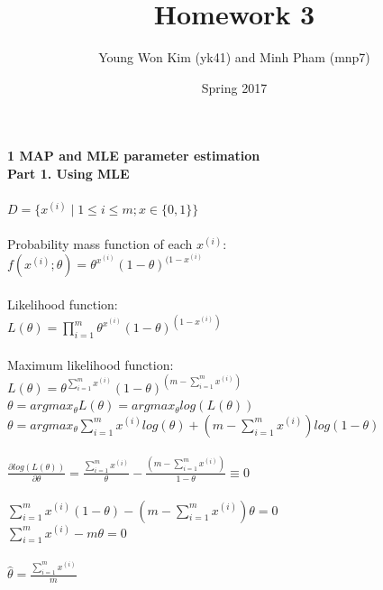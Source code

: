 \documentclass[12pt]{article}
\title{Homework 3}
\author{Young Won Kim (yk41) and Minh Pham (mnp7)}
\date{Spring 2017}
\begin{document}
\maketitle

\noindent \textbf{1 MAP and MLE parameter estimation} \\

\noindent \textbf{Part 1. Using MLE}\\
\\
$D = \{x^{(i)} \mid 1 \leq i \leq m; x \in \{0,1\}\} $
\\
\\
Probability mass function of each $x^{(i)}$:\\

\indent $f(x^{(i)}; \theta) = \theta ^{x^{(i)}} (1-\theta)^{(1-x^{(i)}}$ \\
\\
Likelihood function:\\

\indent $L(\theta) = \prod_{i=1}^m \theta^{x^{(i)}} (1-\theta)^{(1-x^{(i)})}$
\\ 
\\
Maximum likelihood function:\\

\indent $L(\theta) = \theta ^{\sum_{i=1}^m x^{(i)}} (1-\theta)^{(m - \sum_{i=1}^m x^{(i)})}$\\

\indent $\theta = argmax_{\theta} L(\theta) = argmax_{\theta} log(L(\theta))$\\

\indent $\theta = argmax_{\theta} \sum_{i=1}^m x^{(i)} log(\theta) + (m - \sum_{i=1}^m x^{(i)}) log (1-\theta)$\\
\\
\indent $\frac{\partial log(L(\theta))}{\partial \theta} = \frac{\sum_{i=1}^m x^{(i)}} {\theta} - \frac{(m-\sum_{i=1}^m x^{(i)})}{1-\theta} \equiv 0$\\
\\
\indent $\sum_{i=1}^m x^{(i)} (1-\theta) - (m-\sum_{i=1}^m x^{(i)})\theta = 0$\\

$\sum_{i=1}^m x^{(i)} - m\theta = 0$\\
\\
\indent $\widehat{\theta} = \frac{\sum_{i=1}^m x^{(i)}} {m}$
\pagebreak
\end{document}
